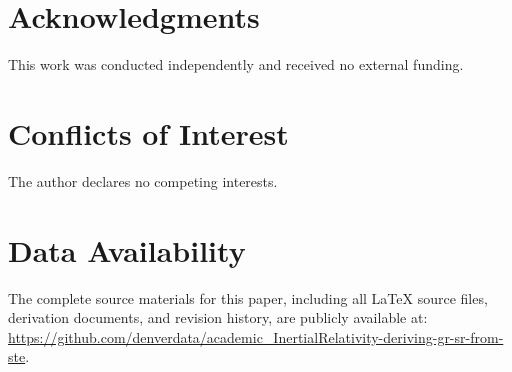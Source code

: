 \documentclass[twoside,twocolumn,9pt]{article}
\begin{document}


\balance

\section*{Acknowledgments}
This work was conducted independently and received no external funding.

\section*{Conflicts of Interest}
The author declares no competing interests.

\section*{Data Availability}
The complete source materials for this paper, including all \LaTeX{} source files, derivation documents, and revision history, are publicly available at: \url{https://github.com/denverdata/academic_InertialRelativity-deriving-gr-sr-from-ste}.

\clearpage
\end{document}
